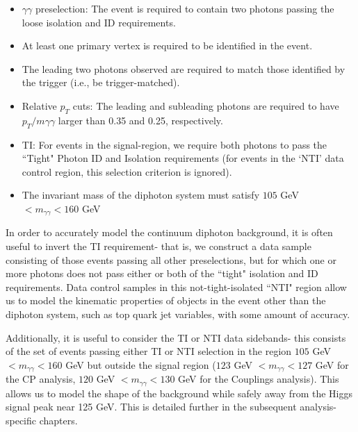 \begin{itemize}
\item $\gamma\gamma$ preselection: The event is required to contain two photons passing the loose isolation and ID requirements.
\item At least one primary vertex is required to be identified in the event.
\item The leading two photons observed are required to match those identified by the trigger (i.e., be trigger-matched).
\item Relative $p_{T}$ cuts: The leading and subleading photons are required to have $p_{T}/m\gamma\gamma$ larger than 0.35 and 0.25, respectively.
\item TI: For events in the signal-region, we require both photons to pass the ``Tight" Photon ID and Isolation requirements (for events in the `NTI' data control region, this selection criterion is ignored). 
\item The invariant mass of the diphoton system must satisfy $105$ GeV $< m_{\gamma\gamma} < 160$ GeV
\end{itemize}

In order to accurately model the continuum diphoton background, it is often useful to invert the TI requirement- that is, we construct a data sample consisting of those events passing all other preselections, but for which one or more photons does not pass either or both of the ``tight" isolation and ID requirements. Data control samples in this not-tight-isolated ``NTI" region allow us to model the kinematic properties of objects in the event other than the diphoton system, such as top quark jet variables, with some amount of accuracy.

Additionally, it is useful to consider the TI or NTI data sidebands- this consists of the set of events passing either TI or NTI selection in the region $105$ GeV $< m_{\gamma\gamma} < 160$ GeV but outside the signal region ($123$ GeV $< m_{\gamma\gamma} < 127$ GeV for the CP analysis, $120$ GeV $< m_{\gamma\gamma} < 130$ GeV for the Couplings analysis). This allows us to model the shape of the background while safely away from the Higgs signal peak near 125 GeV. This is detailed further in the subsequent analysis-specific chapters.
